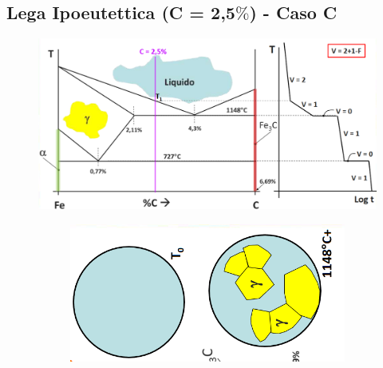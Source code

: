 \documentclass{article}
\begin{document}
{        \subsection{Lega Ipoeutettica (C = 2,5$\%$) - Caso C}
            \begin{figure}[h!]
                \centering
                \includegraphics[width=.7\linewidth]{L14 - C = 2,5 Diagramma di Stato e Traiettoria di Raffreddamento.png}
            \end{figure}
            \begin{figure}
                \centering
                \begin{subfigure}[h!]{.55\linewidth}
                    \includegraphics[width=\linewidth]{L14 - C = 2,5 Strutture Prima di 1148+.png}
                \end{subfigure}
                \begin{subfigure}[h!]{.3\linewidth}

\end{subfigure}
\end{figure}}
\end{document}
